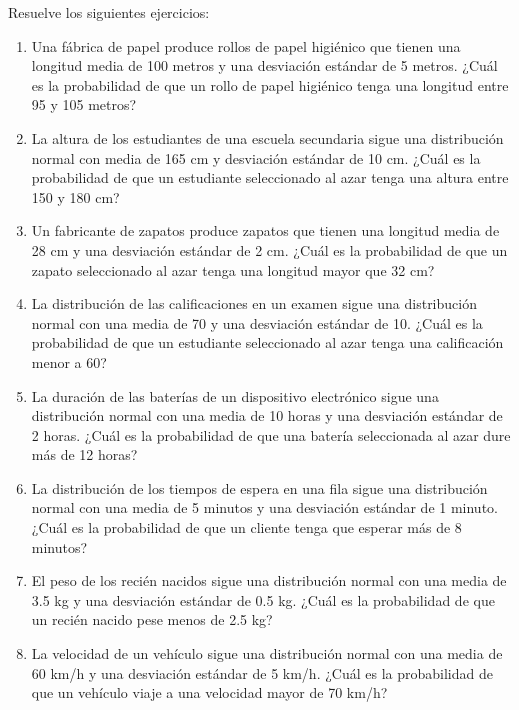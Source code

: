 \begin{Ejer}
Resuelve los siguientes ejercicios:

\begin{enumerate}
    \item Una fábrica de papel produce rollos de papel higiénico que tienen una longitud media de 100 metros y una desviación estándar de 5 metros. ¿Cuál es la probabilidad de que un rollo de papel higiénico tenga una longitud entre 95 y 105 metros?

    \item La altura de los estudiantes de una escuela secundaria sigue una distribución normal con media de 165 cm y desviación estándar de 10 cm. ¿Cuál es la probabilidad de que un estudiante seleccionado al azar tenga una altura entre 150 y 180 cm?

    \item Un fabricante de zapatos produce zapatos que tienen una longitud media de 28 cm y una desviación estándar de 2 cm. ¿Cuál es la probabilidad de que un zapato seleccionado al azar tenga una longitud mayor que 32 cm?

    \item La distribución de las calificaciones en un examen sigue una distribución normal con una media de 70 y una desviación estándar de 10. ¿Cuál es la probabilidad de que un estudiante seleccionado al azar tenga una calificación menor a 60?

    \item La duración de las baterías de un dispositivo electrónico sigue una distribución normal con una media de 10 horas y una desviación estándar de 2 horas. ¿Cuál es la probabilidad de que una batería seleccionada al azar dure más de 12 horas?

    \item La distribución de los tiempos de espera en una fila sigue una distribución normal con una media de 5 minutos y una desviación estándar de 1 minuto. ¿Cuál es la probabilidad de que un cliente tenga que esperar más de 8 minutos?

    \item El peso de los recién nacidos sigue una distribución normal con una media de 3.5 kg y una desviación estándar de 0.5 kg. ¿Cuál es la probabilidad de que un recién nacido pese menos de 2.5 kg?

    \item La velocidad de un vehículo sigue una distribución normal con una media de 60 km/h y una desviación estándar de 5 km/h. ¿Cuál es la probabilidad de que un vehículo viaje a una velocidad mayor de 70 km/h?


\end{enumerate}
\end{Ejer}
